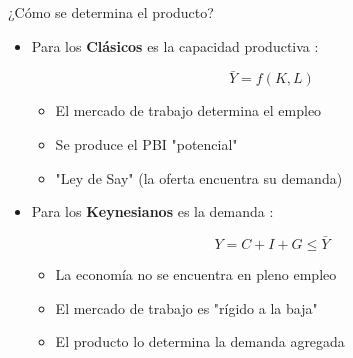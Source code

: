 \documentclass{beamer}
\begin{document}
\begin{frame}{¿Cómo se determina el producto?}

    \begin{itemize}
        \item Para los \textbf{Clásicos} es la capacidad productiva \faCogs:
            \begin{center}
            \begin{boxA}
                    $$ \bar{Y}=f(K, L) $$
             \end{boxA}
             \end{center}
             
            \begin{itemize}
                \item El mercado de trabajo determina el empleo
                \item Se produce el PBI "potencial"
                \item "Ley de Say" (la oferta encuentra su demanda)
            \end{itemize}
        
        \item Para los \textbf{Keynesianos} es la demanda \faShoppingBasket:
            
            \begin{center}
            \begin{boxA}
                    $$ Y = C + I + G \leq \bar{Y} $$
             \end{boxA}
             \end{center}
             
            \begin{itemize}
                \item La economía no se encuentra en pleno empleo
                \item El mercado de trabajo es "rígido a la baja"
                \item El producto lo determina la demanda agregada
            \end{itemize}
    \end{itemize}
\end{frame}
\end{document}
